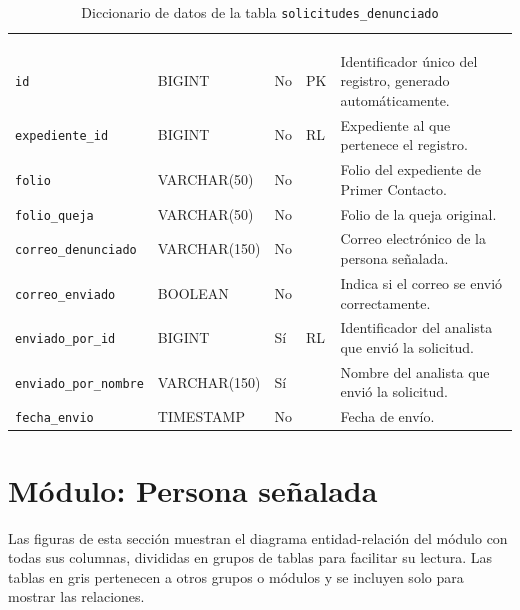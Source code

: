 \footnotesize
\renewcommand{\arraystretch}{1.15}
\setlength{\tabcolsep}{4pt}
\begin{longtable}{|L{3.9cm}|L{2.4cm}|L{0.9cm}|L{1.2cm}|L{6.6cm}|}
	\hiderowcolors\caption{Diccionario de datos de la tabla \texttt{solicitudes\_denunciado}}
	\label{tab:dic_solicitudes_denunciado} \\ \showrowcolors
	\hline
	 &  &  &  &  \\
	\hline
	\endfirsthead
	\hline
	 &  &  &  &  \\
	\hline
	\endhead
		\texttt{id} & BIGINT & No & PK & Identificador único del registro, generado automáticamente. \\ \hline
		\texttt{expediente\_\allowbreak{}id} & BIGINT & No & RL & Expediente al que pertenece el registro. \\ \hline
		\texttt{folio} & VARCHAR(50) & No &  & Folio del expediente de Primer Contacto. \\ \hline
		\texttt{folio\_\allowbreak{}queja} & VARCHAR(50) & No &  & Folio de la queja original. \\ \hline
		\texttt{correo\_\allowbreak{}denunciado} & VARCHAR(150) & No &  & Correo electrónico de la persona señalada. \\ \hline
		\texttt{correo\_\allowbreak{}enviado} & BOOLEAN & No &  & Indica si el correo se envió correctamente. \\ \hline
		\texttt{enviado\_\allowbreak{}por\_\allowbreak{}id} & BIGINT & Sí & RL & Identificador del analista que envió la solicitud. \\ \hline
		\texttt{enviado\_\allowbreak{}por\_\allowbreak{}nombre} & VARCHAR(150) & Sí &  & Nombre del analista que envió la solicitud. \\ \hline
		\texttt{fecha\_\allowbreak{}envio} & TIMESTAMP & No &  & Fecha de envío. \\ \hline
\end{longtable}
\normalsize
\setlength{\tabcolsep}{6pt}
\renewcommand{\arraystretch}{1}

\section{Módulo: Persona señalada}
\label{anx:bd_mod3}

Las figuras de esta sección muestran el diagrama entidad-relación del módulo con todas sus columnas, divididas en grupos de tablas para facilitar su lectura. Las tablas en gris pertenecen a otros grupos o módulos y se incluyen solo para mostrar las relaciones.


